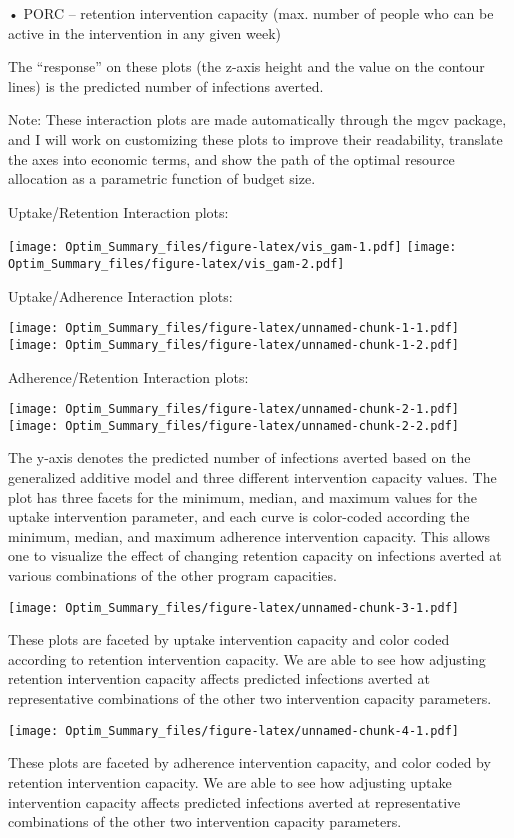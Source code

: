 \documentclass[
]{article}
\begin{document}
• PORC -- retention intervention capacity (max. number of people who can
be active in the intervention in any given week)

The ``response'' on these plots (the z-axis height and the value on the
contour lines) is the predicted number of infections averted.

Note: These interaction plots are made automatically through the mgcv
package, and I will work on customizing these plots to improve their
readability, translate the axes into economic terms, and show the path
of the optimal resource allocation as a parametric function of budget
size.

Uptake/Retention Interaction plots:

\texttt{[image: Optim\_Summary\_files/figure-latex/vis\_gam-1.pdf]}
\texttt{[image: Optim\_Summary\_files/figure-latex/vis\_gam-2.pdf]}

Uptake/Adherence Interaction plots:

\texttt{[image: Optim\_Summary\_files/figure-latex/unnamed-chunk-1-1.pdf]}
\texttt{[image: Optim\_Summary\_files/figure-latex/unnamed-chunk-1-2.pdf]}

Adherence/Retention Interaction plots:

\texttt{[image: Optim\_Summary\_files/figure-latex/unnamed-chunk-2-1.pdf]}
\texttt{[image: Optim\_Summary\_files/figure-latex/unnamed-chunk-2-2.pdf]}

The y-axis denotes the predicted number of infections averted based on
the generalized additive model and three different intervention capacity
values. The plot has three facets for the minimum, median, and maximum
values for the uptake intervention parameter, and each curve is
color-coded according the minimum, median, and maximum adherence
intervention capacity. This allows one to visualize the effect of
changing retention capacity on infections averted at various
combinations of the other program capacities.

\texttt{[image: Optim\_Summary\_files/figure-latex/unnamed-chunk-3-1.pdf]}

These plots are faceted by uptake intervention capacity and color coded
according to retention intervention capacity. We are able to see how
adjusting retention intervention capacity affects predicted infections
averted at representative combinations of the other two intervention
capacity parameters.

\texttt{[image: Optim\_Summary\_files/figure-latex/unnamed-chunk-4-1.pdf]}

These plots are faceted by adherence intervention capacity, and color
coded by retention intervention capacity. We are able to see how
adjusting uptake intervention capacity affects predicted infections
averted at representative combinations of the other two intervention
capacity parameters.
\end{document}
